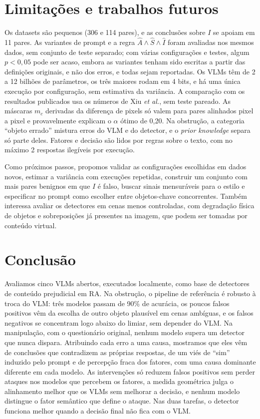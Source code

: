 \documentclass[conference]{IEEEtran}
\begin{document}
\section{Limitações e trabalhos futuros}
\label{sec:lim}

Os datasets são pequenos (306 e 114 pares), e as conclusões sobre $I$ se apoiam em 11 pares. As variantes
de prompt e a regra $\hat A\wedge\hat S\wedge\hat I$ foram avaliadas nos mesmos dados, sem conjunto de
teste separado; com várias configurações e testes, algum $p<0{,}05$ pode ser acaso, embora as variantes
tenham sido escritas a partir das definições originais, e não dos erros, e todas sejam reportadas. Os VLMs têm de 2 a 12
bilhões de parâmetros, os três maiores rodam em 4 bits, e há uma única execução por configuração, sem
estimativa da variância. A comparação com os resultados publicados usa os números de Xiu \emph{et al.}, sem teste
pareado. As máscaras $m_c$ derivadas da diferença de pixels só valem para pares alinhados pixel a pixel e
provavelmente explicam o $\alpha$ ótimo de 0,20. Na obstrução, a categoria ``objeto errado'' mistura erros
do VLM e do detector, e o \emph{prior knowledge} separa só parte deles. Fatores e decisão são lidos por
regras sobre o texto, com no máximo 2 respostas ilegíveis por execução.

Como próximos passos, propomos validar as configurações escolhidas em dados novos, estimar a variância
com execuções repetidas, construir um conjunto com mais pares benignos em que $I$ é falso, buscar sinais
mensuráveis para o estilo e especificar no prompt como escolher entre objetos-chave concorrentes. Também
interessa avaliar os detectores em cenas menos controladas, com degradação física de objetos e
sobreposições já presentes na imagem, que podem ser tomadas por conteúdo virtual.

\section{Conclusão}

Avaliamos cinco VLMs abertos, executados localmente, como base de detectores de conteúdo prejudicial em
RA. Na obstrução, o pipeline de referência é robusto à troca do VLM: três modelos passam de 90\% de
acurácia, os poucos falsos positivos vêm da escolha de outro objeto plausível em cenas ambíguas, e os
falsos negativos se concentram logo abaixo do limiar, sem depender do VLM. Na manipulação, com o
questionário original, nenhum modelo supera um detector que nunca dispara. Atribuindo cada erro a uma
causa, mostramos que eles vêm de conclusões que contradizem as próprias respostas, de um viés de ``sim''
induzido pelo prompt e de percepção fraca dos fatores, com uma causa dominante diferente em cada modelo.
As intervenções só reduzem falsos positivos sem perder ataques nos modelos que percebem os fatores, a
medida geométrica julga o alinhamento melhor que os VLMs sem melhorar a decisão, e nenhum modelo distingue
o fator semântico que define o ataque. Nas duas tarefas, o detector funciona melhor quando a decisão
final não fica com o VLM.
\end{document}
